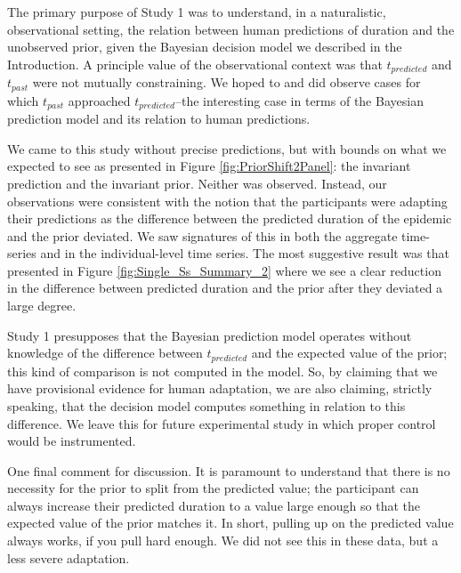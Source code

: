 The primary purpose of Study 1 was to understand, in a naturalistic, observational setting, the relation between human predictions of duration and the unobserved prior, given the Bayesian decision model we described in the Introduction.  A principle value of the observational context was that $t_{predicted}$ and $t_{past}$ were not mutually constraining.  We hoped to and did observe cases for which $t_{past}$ approached $t_{predicted}$--the interesting case in terms of the Bayesian prediction model and its relation to human predictions. 

We came to this study without precise predictions, but with bounds on what we expected to see as presented in Figure \ref{fig:PriorShift2Panel}: the invariant prediction and the invariant prior.  Neither was observed.  Instead, our observations were consistent with the notion that the participants were adapting their predictions as the difference between the predicted duration of the epidemic and the prior deviated.  We saw signatures of this in both the aggregate time-series and in the individual-level time series.  The most suggestive result was that presented in Figure \ref{fig:Single_Ss_Summary_2} where we see a clear reduction in the difference between predicted duration and the prior after they deviated a large degree. 

Study 1 presupposes that the Bayesian prediction model operates without knowledge of the difference between $t_{predicted}$ and the expected value of the prior; this kind of comparison is not computed in the model.  So, by claiming that we have provisional evidence for human adaptation, we are also claiming, strictly speaking, that the decision model computes something in relation to this difference.  We leave this for future experimental study in which proper control would be instrumented.

One final comment for discussion.  It is paramount to understand that there is no necessity for the prior to split from the predicted value; the participant can always increase their predicted duration to a value large enough so that the expected value of the prior matches it.  In short, pulling up on the predicted value always works, if you pull hard enough.  We did not see this in these data, but a less severe adaptation.
